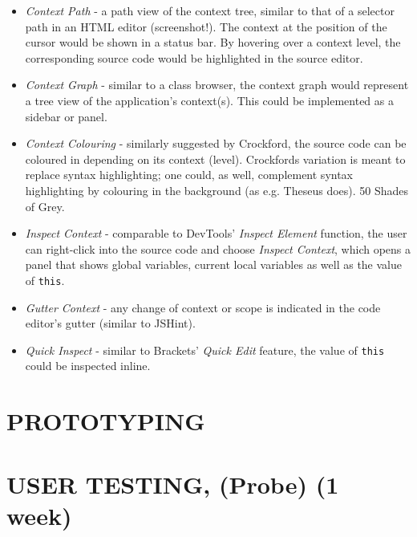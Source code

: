 \begin{itemize}
\itemsep1pt\parskip0pt
\item
  \emph{Context Path} - a path view of the context tree, similar to that
  of a selector path in an HTML editor (screenshot!). The context at the
  position of the cursor would be shown in a status bar. By hovering
  over a context level, the corresponding source code would be
  highlighted in the source editor.
\item
  \emph{Context Graph} - similar to a class browser, the context graph
  would represent a tree view of the application’s context(s). This
  could be implemented as a sidebar or panel.
\item
  \emph{Context Colouring} - similarly suggested by Crockford, the
  source code can be coloured in depending on its context (level).
  Crockfords variation is meant to replace syntax highlighting; one
  could, as well, complement syntax highlighting by colouring in the
  background (as e.g. Theseus does). 50 Shades of Grey.
\item
  \emph{Inspect Context} - comparable to DevTools’ \emph{Inspect
  Element} function, the user can right-click into the source code and
  choose \emph{Inspect Context}, which opens a panel that shows global
  variables, current local variables as well as the value of
  \texttt{this}.
\item
  \emph{Gutter Context} - any change of context or scope is indicated in
  the code editor’s gutter (similar to JSHint).
\item
  \emph{Quick Inspect} - similar to Brackets’ \emph{Quick Edit} feature,
  the value of \texttt{this} could be inspected inline.
\end{itemize}

\section{PROTOTYPING}\label{prototyping}

\section{USER TESTING, (Probe) (1
week)}\label{user-testing-probe-1-week}
